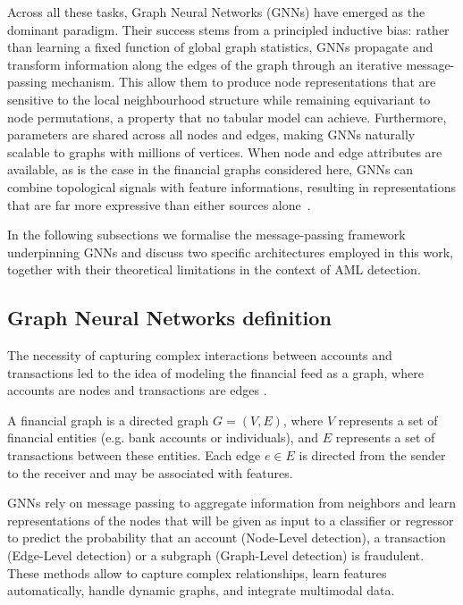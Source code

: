 Across all these tasks, Graph Neural Networks (GNNs) have emerged as the dominant paradigm. Their success stems from a principled inductive bias: rather than learning a fixed function of global graph statistics, GNNs propagate and transform information along the edges of the graph through an iterative message-passing mechanism. This allow them to produce node representations that are sensitive to the local neighbourhood structure while remaining equivariant to node permutations, a property that no tabular model can achieve. Furthermore, parameters are shared across all nodes and edges, making GNNs naturally scalable to graphs with millions of vertices. When node and edge attributes are available, as is the case in the financial graphs considered here, GNNs can combine topological signals with feature informations, resulting in representations that are far more expressive than either sources alone~\cite{wu2020comprehensive}.

In the following subsections we formalise the message-passing framework underpinning GNNs and discuss two specific architectures employed in this work, together with their theoretical limitations in the context of AML detection.

\subsection{Graph Neural Networks definition}
The necessity of capturing complex interactions between accounts and transactions led to the idea of modeling the financial feed as a graph, where accounts are nodes and transactions are edges \cite{singh2019anti}.

\begin{definition}\label{financialGraph}
A financial graph is a directed graph $G = (V, E)$, where $V$ represents a set of financial entities (e.g. bank accounts or individuals), and $E$ represents a set of transactions between these entities. Each edge $e \in E$ is directed from the sender to the receiver and may be associated with features.
\end{definition}

GNNs rely on message passing to aggregate information from neighbors and learn representations of the nodes that will be given as input to a classifier or regressor to predict the probability that an account (Node-Level detection), a transaction (Edge-Level detection) or a subgraph (Graph-Level detection) is fraudulent. These methods allow to capture complex relationships, learn features automatically, handle dynamic graphs, and integrate multimodal data.

